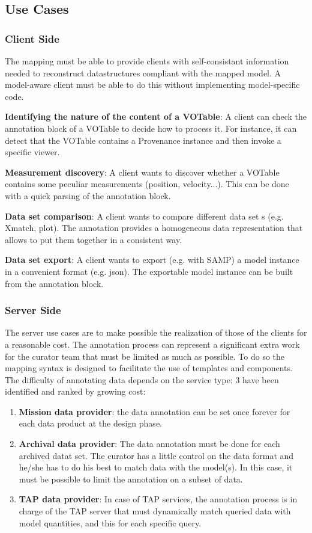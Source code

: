 \documentclass[11pt,a4paper]{ivoa}
\begin{document}
\subsection{Use Cases}

\subsubsection{Client Side}

The mapping must be able to provide clients with self-consistant information needed to reconstruct datastructures compliant with the mapped model. 
A model-aware client must be able to do this without implementing model-specific  code.  

\textbf{Identifying the nature of the content of a VOTable}:  A client can check the annotation block of a VOTable to decide how to process it. For instance, it can detect that the VOTable contains a Provenance instance  and then invoke a specific viewer. 

\textbf{Measurement discovery}: A client wants to discover whether a VOTable contains some peculiar measurements (position, velocity...). This can be done with a quick parsing of the annotation block.

\textbf{Data set comparison}: A client wants to compare different data set s (e.g. Xmatch, plot). The annotation provides a homogeneous data representation that allows to put them together in a consistent way. 

\textbf{Data set export}: A client wants to export (e.g. with SAMP) a model instance in a convenient format (e.g. json). The exportable model instance can be built from the annotation block.

\subsubsection{Server Side}
The server use cases are to make possible the realization of those of the clients  for a reasonable cost. The annotation process can represent a significant extra work for the curator team that must be limited as much as possible. To do so the mapping syntax is designed to facilitate the use of templates and components.
The difficulty of annotating data depends on the service type: 3 have been identified and ranked by growing cost:
\begin{enumerate}
   \item \textbf{Mission data provider}: the data annotation can be set once forever for each data product at the design phase.
   \item \textbf{Archival data provider}: The data annotation must be done for each archived datat set. 
           The curator has a little control on the data format and he/she has to do his best to match data with the model(s).
           In this case, it must be possible to limit the annotation on a subset of data.
   \item \textbf{TAP data provider}: In case of TAP services, the annotation process is in charge of the TAP server that must dynamically match queried data with model quantities, and this for each specific query.
\end{enumerate}
\end{document}
